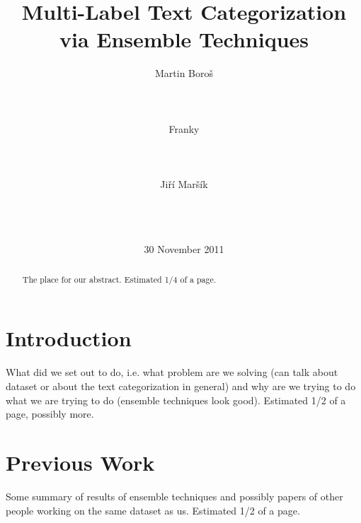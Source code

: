 \documentclass{acm_proc_article-sp}
\begin{document}
\title{Multi-Label Text Categorization via Ensemble Techniques}

\author{
\alignauthor
Martin Boro\v{s}\\
       \\
       \\
       \\
\alignauthor
Franky\\
       \\
       \\
       \\
\alignauthor
Ji\v{r}\'{i} Mar\v{s}\'{i}k\\
       \\
       \\
       \\
       }

\date{30 November 2011}

\maketitle
\begin{abstract}
The place for our abstract. Estimated 1/4 of a page.
\end{abstract}




\section{Introduction}
What did we set out to do, i.e. what problem are we solving (can talk about
dataset or about the text categorization in general) and why are we trying to do
what we are trying to do (ensemble techniques look good). Estimated 1/2 of a
page, possibly more.

\section{Previous Work}
Some summary of results of ensemble techniques and possibly papers of other
people working on the same dataset as us. Estimated 1/2 of a page.







\balancecolumns
\end{document}
